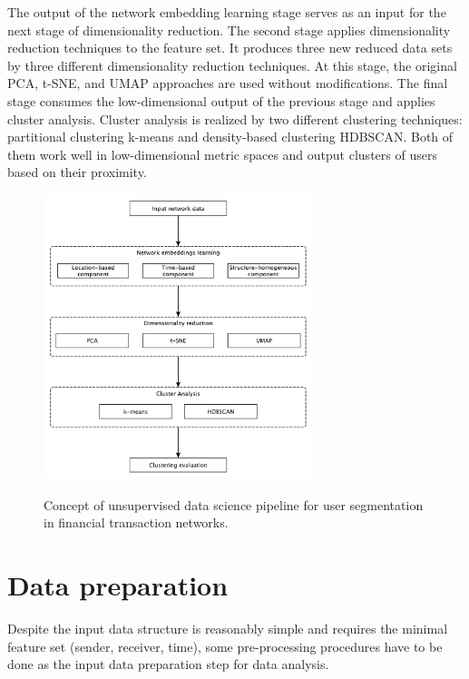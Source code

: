 The output of the network embedding learning stage serves as an input for the next stage of dimensionality reduction. The second stage applies dimensionality reduction techniques to the feature set. It produces three new reduced data sets by three different dimensionality reduction techniques. At this stage, the original PCA, t-SNE, and UMAP approaches are used without modifications. The final stage consumes the low-dimensional output of the previous stage and applies cluster analysis. Cluster analysis is realized by two different clustering techniques: partitional clustering k-means and density-based clustering HDBSCAN. Both of them work well in low-dimensional metric spaces and output clusters of users based on their proximity.
\begin{figure}[!ht]
	\centering
	\includegraphics[width=0.7\textwidth]{images/Fig28.pdf}\\
	\caption{Concept of unsupervised data science pipeline for user segmentation in financial transaction networks.}
	\label{fig:Fig28}
\end{figure}

\section{Data preparation}
\label{Data Preparation}
Despite the input data structure is reasonably simple and requires the minimal feature set (sender, receiver, time), some pre-processing procedures have to be done as the input data preparation step for data analysis.


